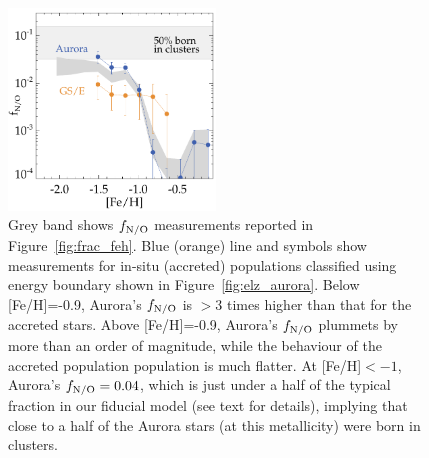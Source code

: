 \documentclass[a4paper,useAMS,usenatbib]{mnras}
\begin{document}
%
\begin{figure}
  \centering
  \includegraphics[width=0.49\textwidth]{img/fraction_feh_aur_acc.pdf}
  \caption[]{Grey band shows $f_{\rm N/O}$ measurements reported in Figure~\ref{fig:frac_feh}. Blue (orange) line and symbols show measurements for in-situ (accreted) populations classified using energy boundary shown in Figure~\ref{fig:elz_aurora}. Below [Fe/H]=-0.9, Aurora's $f_{\rm N/O}$ is $>3$ times higher than that for the accreted stars. Above [Fe/H]=-0.9, Aurora's $f_{\rm N/O}$ plummets by more than an order of magnitude, while the behaviour of the accreted population population is much flatter. At [Fe/H]$<-1$, Aurora's $f_{\rm N/O}=0.04$, which is just under a half of the typical fraction in our fiducial model (see text for details), implying that close to a half of the Aurora stars (at this metallicity) were born in clusters. }
   \label{fig:frac_feh2}
\end{figure}
%
\end{document}
